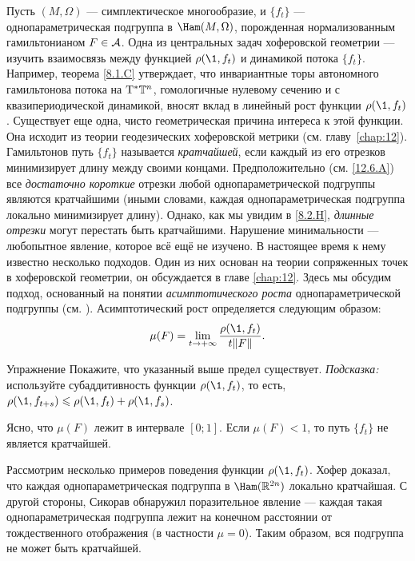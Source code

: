 Пусть $(M, \Omega)$ — симплектическое многообразие, и $\{f_t\}$ —
однопараметрическая подгруппа в $\Ham (M, \Omega)$, порожденная
нормализованным гамильтонианом $F \in \mathcal{A}$. 
Одна из центральных задач хоферовской геометрии — изучить
взаимосвязь между функцией $\rho (\1, f_t)$ и динамикой потока
$\{f_t\}$.
Например, теорема \ref{8.1.C} утверждает, что инвариантные торы
автономного гамильтонова потока на $\mathrm{T}^\ast \mathbb{T}^n$,  гомологичные
нулевому сечению и с квазипериодической динамикой, вносят вклад в
линейный рост функции $\rho (\1, f_t)$. 
Существует еще одна, чисто геометрическая причина интереса к этой функции.
Она исходит из теории геодезических хоферовской метрики (см. главу~\ref{chap:12}). 
Гамильтонов путь $\{f_t\}$ называется
\emph{кратчайшей}, если каждый из его отрезков
минимизирует длину между своими концами.
Предположительно (см. \ref{12.6.A}) все {}\emph{достаточно короткие}
отрезки любой однопараметрической подгруппы являются кратчайшими
(иными словами, каждая однопараметрическая подгруппа локально
минимизирует длину). 
Однако, как мы увидим в \ref{8.2.H}, {}\emph{длинные отрезки} могут перестать
быть кратчайшими. 
Нарушение минимальности — любопытное явление, которое всё ещё не изучено.
В настоящее время к нему известно несколько подходов.
Один из них основан на теории сопряженных точек в хоферовской
геометрии, он обсуждается в главе \ref{chap:12}. 
Здесь мы обсудим подход, основанный на понятии \emph{асимптотического роста}
однопараметрической подгруппы (см. \cite{BP2}). 
Асимптотический рост определяется следующим образом: 
\[\mu(F)=\lim_{t \to + \infty}\frac{\rho (\1, f_t)}{ t \| F \|}.\]

\begin{ex*}{Упражнение}
Покажите, что указанный выше предел существует.
\emph{Подсказка:} используйте субаддитивность функции $\rho (\1, f_t)$, то есть, $\rho (\1, f_{t + s}) \le \rho (\1, f_t) + \rho (\1, f_s)$. 
\end{ex*}

Ясно, что $\mu (F)$ лежит в интервале $[0; 1]$.
Если $\mu (F) <1$, то путь $\{f_t\}$ не является кратчайшей.

Рассмотрим несколько примеров поведения функции $\rho (\1, f_t)$.
Хофер \cite{H2} доказал, что каждая однопараметрическая подгруппа в
$\Ham (\RR^{2n})$ локально кратчайшая. 
С другой стороны, Сикорав \cite{S2} обнаружил поразительное явление --- каждая такая однопараметрическая подгруппа лежит на конечном расстоянии от тождественного отображения (в частности $\mu=0$).
Таким образом, вся подгруппа не может быть кратчайшей. 

